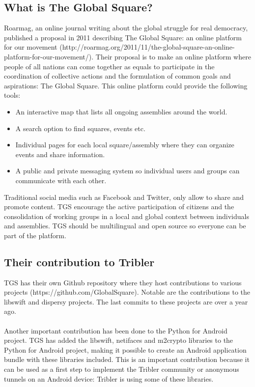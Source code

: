 \documentclass[11pt]{article}
\begin{document}
\subsection{What is The Global Square?}
Roarmag, an online journal writing about the global struggle for real democracy, published a proposal in 2011 describing The Global Square: an online platform for our movement (http://roarmag.org/2011/11/the-global-square-an-online-platform-for-our-movement/). Their proposal is to make an online platform where people of all nations can come together as equals to participate in the coordination of collective actions and the formulation of common goals and aspirations: The Global Square. This online platform could provide the following tools:
\begin{itemize}
\item An interactive map that lists all ongoing assemblies around the world.
\item A search option to find squares, events etc.
\item Individual pages for each local square/assembly where they can organize events and share information.
\item A public and private messaging system so individual users and groups can communicate with each other.
\end{itemize}
Traditional social media such as Facebook and Twitter, only allow to share and promote content. TGS encourage the active participation of citizens and the consolidation of working groups in a local and global context between individuals and assemblies. TGS should be multilingual and open source so everyone can be part of the platform.

\subsection{Their contribution to Tribler}
TGS has their own Github repository where they host contributions to various projects (https://github.com/GlobalSquare). Notable are the contributions to the libswift and dispersy projects. The last commits to these projects are over a year ago.\\\\
Another important contribution has been done to the Python for Android project. TGS has added the libswift, netifaces and m2crypto libraries to the Python for Android project, making it possible to create an Android application bundle with these libraries included. This is an important contribution because it can be used as a first step to implement the Tribler community or anonymous tunnels on an Android device: Tribler is using some of these libraries.
\end{document}
